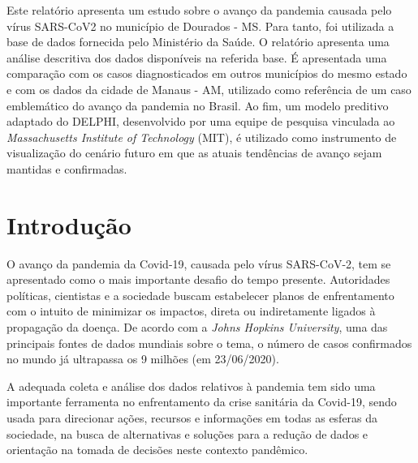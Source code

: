 \documentclass[12pt]{article}
\begin{document}
\begin{resumo} 
  Este relatório apresenta um estudo sobre o avanço da pandemia causada pelo vírus SARS-CoV2 no município de Dourados - MS. Para tanto, foi utilizada a base de dados fornecida pelo Ministério da Saúde. O relatório apresenta uma análise descritiva dos dados disponíveis na referida base. É apresentada uma comparação com os casos diagnosticados em outros municípios do mesmo estado e com os dados da cidade de Manaus - AM, utilizado como referência de um caso emblemático do avanço da pandemia no Brasil. Ao fim, um modelo preditivo adaptado do DELPHI, desenvolvido por uma equipe de pesquisa vinculada ao \textit{Massachusetts Institute of Technology} (MIT), é utilizado como instrumento de visualização do cenário futuro em que as atuais tendências de avanço sejam mantidas e confirmadas.
\end{resumo}


\section{Introdução}

O avanço da pandemia da Covid-19, causada pelo vírus SARS-CoV-2, tem se apresentado como o mais importante desafio do tempo presente. Autoridades políticas, cientistas e a sociedade buscam estabelecer planos de enfrentamento com o intuito de minimizar os impactos, direta ou indiretamente ligados à propagação da doença. De acordo com a \textit{Johns Hopkins University}, uma das principais fontes de dados mundiais sobre o tema, o número de casos confirmados no mundo já ultrapassa os 9 milhões (em 23/06/2020).

A adequada coleta e análise dos dados relativos à pandemia tem sido uma importante ferramenta no enfrentamento da crise sanitária da Covid-19, sendo usada para direcionar ações, recursos e informações em todas as esferas da sociedade, na busca de alternativas e soluções para a redução de dados e orientação na tomada de decisões neste contexto pandêmico.
\end{document}
